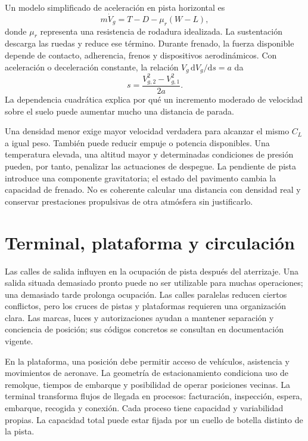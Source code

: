 Un modelo simplificado de aceleración en pista horizontal es
\begin{equation}
m\dot V_g=T-D-\mu_r(W-L),
\end{equation}
donde $\mu_r$ representa una resistencia de rodadura idealizada. La sustentación descarga las ruedas y reduce ese término. Durante frenado, la fuerza disponible depende de contacto, adherencia, frenos y dispositivos aerodinámicos. Con aceleración o deceleración constante, la relación $V_g\,\mathrm dV_g/\mathrm ds=a$ da
\begin{equation}\label{eq:13-stop}
s=\frac{V_{g,2}^2-V_{g,1}^2}{2a}.
\end{equation}
La dependencia cuadrática explica por qué un incremento moderado de velocidad sobre el suelo puede aumentar mucho una distancia de parada.

Una densidad menor exige mayor velocidad verdadera para alcanzar el mismo $C_L$ a igual peso. También puede reducir empuje o potencia disponibles. Una temperatura elevada, una altitud mayor y determinadas condiciones de presión pueden, por tanto, penalizar las actuaciones de despegue. La pendiente de pista introduce una componente gravitatoria; el estado del pavimento cambia la capacidad de frenado. No es coherente calcular una distancia con densidad real y conservar prestaciones propulsivas de otra atmósfera sin justificarlo.

\section{Terminal, plataforma y circulación}
Las calles de salida influyen en la ocupación de pista después del aterrizaje. Una salida situada demasiado pronto puede no ser utilizable para muchas operaciones; una demasiado tarde prolonga ocupación. Las calles paralelas reducen ciertos conflictos, pero los cruces de pistas y plataformas requieren una organización clara. Las marcas, luces y autorizaciones ayudan a mantener separación y conciencia de posición; sus códigos concretos se consultan en documentación vigente.

En la plataforma, una posición debe permitir acceso de vehículos, asistencia y movimientos de aeronave. La geometría de estacionamiento condiciona uso de remolque, tiempos de embarque y posibilidad de operar posiciones vecinas. La terminal transforma flujos de llegada en procesos: facturación, inspección, espera, embarque, recogida y conexión. Cada proceso tiene capacidad y variabilidad propias. La capacidad total puede estar fijada por un cuello de botella distinto de la pista.


